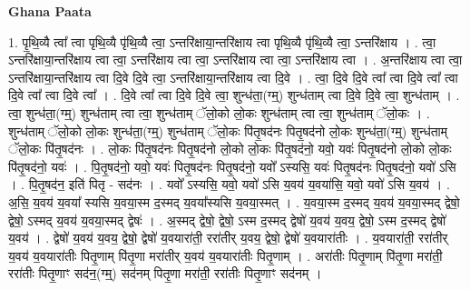\documentclass[17pt]{extarticle}
\begin{document}
\textbf{Ghana Paata } \newline

1. पृ॒थि॒व्यै त्वा᳚ त्वा पृथि॒व्यै पृ॑थि॒व्यै त्वा॒ ऽन्तरि॑क्षाया॒न्तरि॑क्षाय त्वा पृथि॒व्यै पृ॑थि॒व्यै त्वा॒ ऽन्तरि॑क्षाय । . त्वा॒ ऽन्तरि॑क्षाया॒न्तरि॑क्षाय त्वा त्वा॒ ऽन्तरि॑क्षाय त्वा त्वा॒ ऽन्तरि॑क्षाय त्वा त्वा॒ ऽन्तरि॑क्षाय त्वा । . अ॒न्तरि॑क्षाय त्वा त्वा॒ ऽन्तरि॑क्षाया॒न्तरि॑क्षाय त्वा दि॒वे दि॒वे त्वा॒ ऽन्तरि॑क्षाया॒न्तरि॑क्षाय त्वा दि॒वे । . त्वा॒ दि॒वे दि॒वे त्वा᳚ त्वा दि॒वे त्वा᳚ त्वा दि॒वे त्वा᳚ त्वा दि॒वे त्वा᳚ । . दि॒वे त्वा᳚ त्वा दि॒वे दि॒वे त्वा॒ शुन्ध॑ता॒(ग्म्॒) शुन्ध॑ताम् त्वा दि॒वे दि॒वे त्वा॒ शुन्ध॑ताम् । . त्वा॒ शुन्ध॑ता॒(ग्म्॒) शुन्ध॑ताम् त्वा त्वा॒ शुन्ध॑ताम् ॅलो॒को लो॒कः शुन्ध॑ताम् त्वा त्वा॒ शुन्ध॑ताम् ॅलो॒कः । . शुन्ध॑ताम् ॅलो॒को लो॒कः शुन्ध॑ता॒(ग्म्॒) शुन्ध॑ताम् ॅलो॒कः पि॑तृ॒षद॑नः पितृ॒षद॑नो लो॒कः शुन्ध॑ता॒(ग्म्॒) शुन्ध॑ताम् ॅलो॒कः पि॑तृ॒षद॑नः । . लो॒कः पि॑तृ॒षद॑नः पितृ॒षद॑नो लो॒को लो॒कः पि॑तृ॒षद॑नो॒ यवो॒ यवः॑ पितृ॒षद॑नो लो॒को लो॒कः पि॑तृ॒षद॑नो॒ यवः॑ । . पि॒तृ॒षद॑नो॒ यवो॒ यवः॑ पितृ॒षद॑नः पितृ॒षद॑नो॒ यवो᳚ ऽस्यसि॒ यवः॑ पितृ॒षद॑नः पितृ॒षद॑नो॒ यवो॑ ऽसि । . पि॒तृ॒षद॑न॒ इति॑ पितृ - सद॑नः । . यवो᳚ ऽस्यसि॒ यवो॒ यवो॑ ऽसि य॒वय॑ य॒वया॑सि॒ यवो॒ यवो॑ ऽसि य॒वय॑ । . अ॒सि॒ य॒वय॑ य॒वया᳚ स्यसि य॒वया॒स्म द॒स्मद् य॒वया᳚स्यसि य॒वया॒स्मत् । . य॒वया॒स्म द॒स्मद् य॒वय॑ य॒वया॒स्मद् द्वेषो॒ द्वेषो॒ ऽस्मद् य॒वय॑ य॒वया॒स्मद् द्वेषः॑ । . अ॒स्मद् द्वेषो॒ द्वेषो॒ ऽस्म द॒स्मद् द्वेषो॑ य॒वय॑ य॒वय॒ द्वेषो॒ ऽस्म द॒स्मद् द्वेषो॑ य॒वय॑ । . द्वेषो॑ य॒वय॑ य॒वय॒ द्वेषो॒ द्वेषो॑ य॒वयारा॑ती॒ ररा॑तीर् य॒वय॒ द्वेषो॒ द्वेषो॑ य॒वयारा॑तीः । . य॒वयारा॑ती॒ ररा॑तीर् य॒वय॑ य॒वयारा॑तीः पितृ॒णाम् पि॑तृ॒णा मरा॑तीर् य॒वय॑ य॒वयारा॑तीः पितृ॒णाम् । . अरा॑तीः पितृ॒णाम् पि॑तृ॒णा मरा॑ती॒ ररा॑तीः पितृ॒णाꣳ सद॑न॒(ग्म्॒) सद॑नम् पितृ॒णा मरा॑ती॒ ररा॑तीः पितृ॒णाꣳ सद॑नम् । \newline
\end{document}
